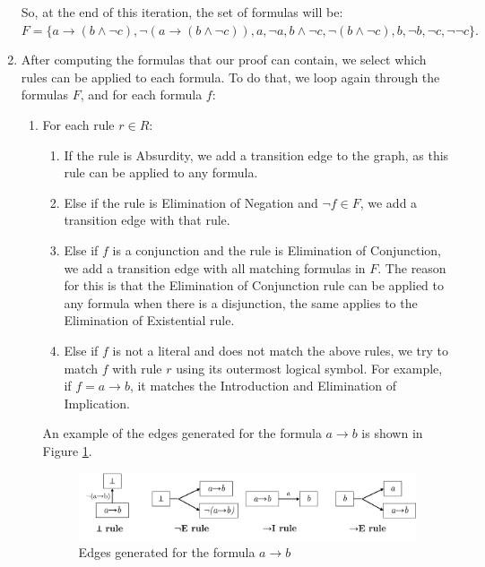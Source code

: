\documentclass[runningheads]{llncs}
\begin{document}
\begin{enumerate}
    So, at the end of this iteration, the set of formulas will be: \(
    F = \{ a \to ( b \land \lnot c), \lnot(a \to ( b \land \lnot c)), a, \lnot a, b \land \lnot c, \lnot(b \land \lnot c), b, \lnot b, \lnot c, \lnot\lnot c \}.
    \)

    \item After computing the formulas that our proof can contain, we select which rules can be applied to each formula. To do that, we loop again through the formulas \(F\), and for each formula \(f\):

       \begin{enumerate}
            \item For each rule \(r \in R\):

            \begin{enumerate}
                \item If the rule is Absurdity, we add a transition edge to the graph, as this rule can be applied to any formula.
                \item Else if the rule is Elimination of Negation and \(\lnot f \in F\), we add a transition edge with that rule.
                \item Else if \(f\) is a conjunction and the rule is Elimination of Conjunction, we add a transition edge with all matching formulas in \(F\). The reason for this is that the Elimination of Conjunction rule can be applied to any formula when there is a disjunction, the same applies to the Elimination of Existential rule.
                \item Else if \(f\) is not a literal and does not match the above rules, we try to match \(f\) with rule \(r\) using its outermost logical symbol. For example, if \(f = a \to b\), it matches the Introduction and Elimination of Implication.
            \end{enumerate}  

            An example of the edges generated for the formula \(a \to b\) is shown in Figure \ref{fig:tg-edges}.
    
            \begin{figure}
                \centering
                \includegraphics[width=1\linewidth]{resources/tg-edges.jpg}
                \caption{Edges generated for the formula \(a \to b\)}
                \label{fig:tg-edges}
            \end{figure}
    \end{enumerate}    


\end{enumerate}
\end{document}

